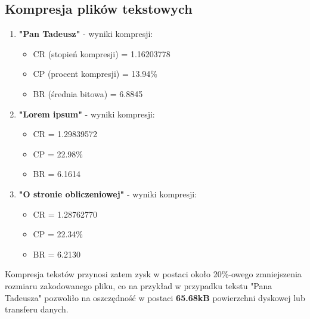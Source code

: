 \documentclass{article}
\begin{document}
\subsection{Kompresja plików tekstowych}
\begin{enumerate}
\item \textbf{"Pan Tadeusz"} - wyniki kompresji:
    \begin{itemize}
        \item CR (stopień kompresji) = 1.16203778
        \item CP (procent kompresji) = 13.94\%
        \item BR (średnia bitowa) = 6.8845
    \end{itemize}
\item \textbf{"Lorem ipsum"} - wyniki kompresji:
    \begin{itemize}
        \item CR = 1.29839572
        \item CP = 22.98\%
        \item BR = 6.1614
    \end{itemize}
\item \textbf{"O stronie obliczeniowej"} - wyniki kompresji:
    \begin{itemize}
        \item CR = 1.28762770
        \item CP = 22.34\%
        \item BR = 6.2130
    \end{itemize}
\end{enumerate}

Kompresja tekstów przynosi zatem zysk w postaci około 20\%-owego zmniejszenia rozmiaru zakodowanego pliku, co na przykład w przypadku tekstu "Pana Tadeusza" pozwoliło na oszczędność w postaci \textbf{65.68kB} powierzchni dyskowej lub transferu danych.
\end{document}
